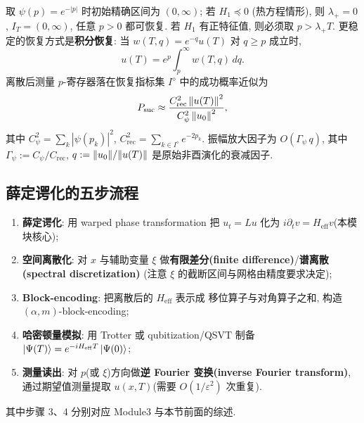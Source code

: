 \documentclass[utf8]{article} %
\numberwithin{equation}{section}   %
\newtheorem{Def}{\hskip 2em {\color{green} 定义}}[subsection]
\newtheorem{Note}{\hskip 2em {\color{red} 注}}[subsection]
\begin{document}
\begin{Note}[特例与积分恢复]
    取 $\psi(p) = e^{-|p|}$ 时初始精确区间为 $(0, \infty)$; 若 $H_1 \preceq 0$
    (热方程情形), 则 $\lambda_+ = 0$, $I_T = (0,\infty)$, 任意 $p > 0$ 都可恢复.
    若 $H_1$ 有正特征值, 则必须取 $p > \lambda_+ T$.
    更稳定的恢复方式是\textbf{积分恢复}: 当 $w(T,q) = e^{-q}u(T)$ 对 $q \ge p$
    成立时,
    \begin{equation}
        u(T) = e^{p} \int_p^\infty w(T,q)\,dq.
    \end{equation}
    离散后测量 $p$-寄存器落在恢复指标集 $I^\diamond$ 中的成功概率近似为
    \begin{equation}
        P_{\mathrm{suc}} \approx \frac{C_{\mathrm{rec}}^2\, \norm{u(T)}^2}
        {C_\psi^2\, \norm{u_0}^2},
    \end{equation}
    其中 $C_\psi^2 = \sum_k |\psi(p_k)|^2$, $C_{\mathrm{rec}}^2 = \sum_{k \in I^\diamond} e^{-2p_k}$.
    振幅放大因子为 $O(\Gamma_\psi\, q)$, 其中
    $\Gamma_\psi := C_\psi/C_{\mathrm{rec}}$, $q := \norm{u_0}/\norm{u(T)}$
    是原始非酉演化的衰减因子.
\end{Note}

\subsection{薛定谔化的五步流程}

\begin{Def}
    \begin{enumerate}
        \item \textbf{薛定谔化}: 用 warped phase transformation 把 $u_t = Lu$
        化为 $i\partial_t v = H_{\mathrm{eff}} v$(本模块核心);
        \item \textbf{空间离散化}: 对 $x$ 与辅助变量 $\xi$ 做\textbf{有限差分(finite difference)}/\textbf{谱离散(spectral discretization)}
        (注意 $\xi$ 的截断区间与网格由精度要求决定);
        \item \textbf{Block-encoding}: 把离散后的 $H_{\mathrm{eff}}$ 表示成
        移位算子与对角算子之和, 构造 $(\alpha, m)$-block-encoding;
        \item \textbf{哈密顿量模拟}: 用 Trotter 或 qubitization/QSVT 制备
        $\ket{\Psi(T)} = e^{-iH_{\mathrm{eff}}T}\ket{\Psi(0)}$;
        \item \textbf{测量读出}: 对 $p$(或 $\xi$)方向做\textbf{逆 Fourier 变换(inverse Fourier transform)},
        通过期望值测量提取 $u(x, T)$(需要 $O(1/\varepsilon^2)$ 次重复).
    \end{enumerate}
    其中步骤 3、4 分别对应 Module3 与本节前面的综述.
\end{Def}
\end{document}
